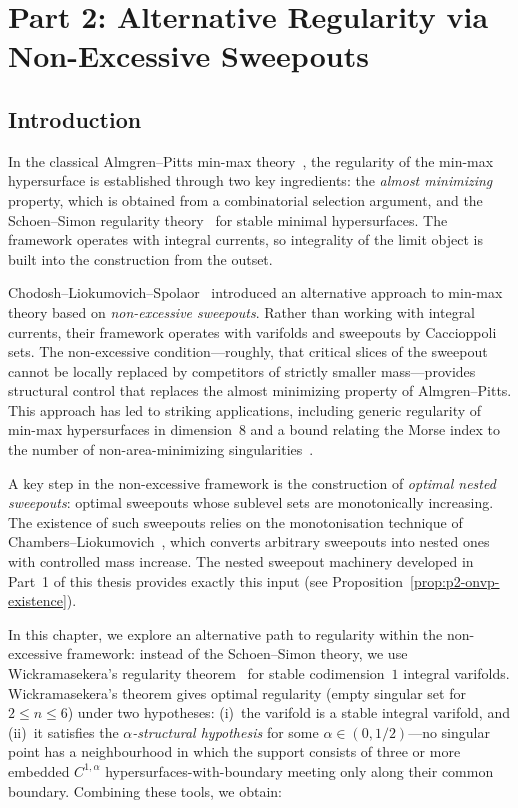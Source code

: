 \chapter{Part 2: Alternative Regularity via Non-Excessive Sweepouts}\label{ch:alternative-regularity}

\section{Introduction}

In the classical Almgren--Pitts min-max theory~\cite{Alm65, Pit81}, the regularity of the min-max hypersurface is established through two key ingredients: the \emph{almost minimizing} property, which is obtained from a combinatorial selection argument, and the Schoen--Simon regularity theory~\cite{SS81} for stable minimal hypersurfaces. The framework operates with integral currents, so integrality of the limit object is built into the construction from the outset.

Chodosh--Liokumovich--Spolaor~\cite{CLS22} introduced an alternative approach to min-max theory based on \emph{non-excessive sweepouts}. Rather than working with integral currents, their framework operates with varifolds and sweepouts by Caccioppoli sets. The non-excessive condition---roughly, that critical slices of the sweepout cannot be locally replaced by competitors of strictly smaller mass---provides structural control that replaces the almost minimizing property of Almgren--Pitts. This approach has led to striking applications, including generic regularity of min-max hypersurfaces in dimension~$8$ and a bound relating the Morse index to the number of non-area-minimizing singularities~\cite{CLS22}.

A key step in the non-excessive framework is the construction of \emph{optimal nested sweepouts}: optimal sweepouts whose sublevel sets are monotonically increasing. The existence of such sweepouts relies on the monotonisation technique of Chambers--Liokumovich~\cite{CL20}, which converts arbitrary sweepouts into nested ones with controlled mass increase. The nested sweepout machinery developed in Part~1 of this thesis provides exactly this input (see Proposition~\ref{prop:p2-onvp-existence}).

In this chapter, we explore an alternative path to regularity within the non-excessive framework: instead of the Schoen--Simon theory, we use Wickramasekera's regularity theorem~\cite{Wic14} for stable codimension~$1$ integral varifolds. Wickramasekera's theorem gives optimal regularity (empty singular set for $2 \leq n \leq 6$) under two hypotheses: (i)~the varifold is a stable integral varifold, and (ii)~it satisfies the \emph{$\alpha$-structural hypothesis} for some $\alpha \in (0, 1/2)$---no singular point has a neighbourhood in which the support consists of three or more embedded $C^{1,\alpha}$ hypersurfaces-with-boundary meeting only along their common boundary. Combining these tools, we obtain:

